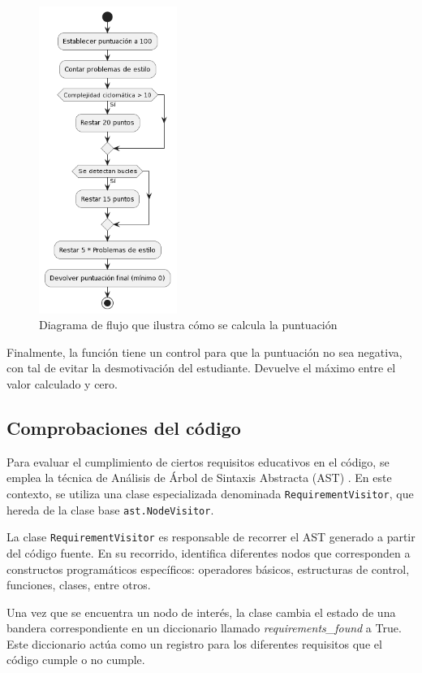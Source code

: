 \begin{figure}[H]
    \centering
    \includegraphics[width=0.4\textwidth]{imagenes/puntuacionejercicio.png}
    \caption{Diagrama de flujo que ilustra cómo se calcula la puntuación}
    \label{fig:puntuacion}
\end{figure}

Finalmente, la función tiene un control para que la puntuación no sea negativa, con tal de evitar la desmotivación del estudiante. Devuelve el máximo entre el valor calculado y cero.

\subsection{Comprobaciones del código}

Para evaluar el cumplimiento de ciertos requisitos educativos en el código, se emplea la técnica de Análisis de Árbol de Sintaxis Abstracta (AST) \cite{astlibrary}. En este contexto, se utiliza una clase especializada denominada \texttt{RequirementVisitor}, que hereda de la clase base \texttt{ast.NodeVisitor}.

La clase \texttt{RequirementVisitor} es responsable de recorrer el AST generado a partir del código fuente. En su recorrido, identifica diferentes nodos que corresponden a constructos programáticos específicos: operadores básicos, estructuras de control, funciones, clases, entre otros.

Una vez que se encuentra un nodo de interés, la clase cambia el estado de una bandera correspondiente en un diccionario llamado \textit{requirements\_found} a True. Este diccionario actúa como un registro para los diferentes requisitos que el código cumple o no cumple.

